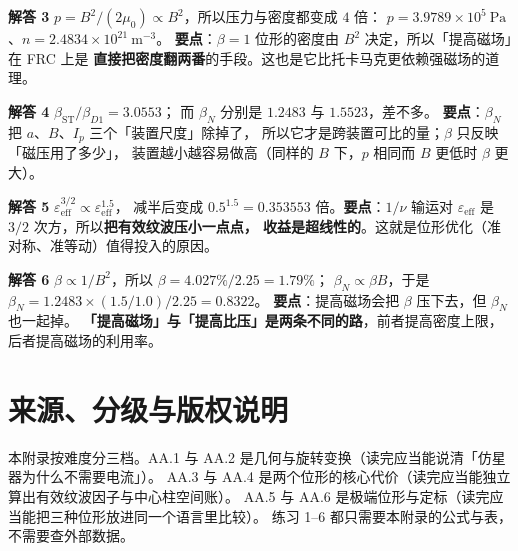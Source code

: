 \textbf{解答 3} $p = B^2/(2\mu_0) \propto B^2$，所以压力与密度都变成 $4$ 倍：
$p = 3.9789\times10^{5}\ \mathrm{Pa}$、$n = 2.4834\times10^{21}\ \mathrm{m^{-3}}$。
\textbf{要点}：$\beta=1$ 位形的密度由 $B^2$ 决定，所以「提高磁场」在 FRC 上是
\textbf{直接把密度翻两番}的手段。这也是它比托卡马克更依赖强磁场的道理。

\textbf{解答 4} $\beta_{\mathrm{ST}}/\beta_{D1} = 3.0553$；
而 $\beta_N$ 分别是 $1.2483$ 与 $1.5523$，差不多。
\textbf{要点}：$\beta_N$ 把 $a$、$B$、$I_p$ 三个「装置尺度」除掉了，
所以它才是跨装置可比的量；$\beta$ 只反映「磁压用了多少」，
装置越小越容易做高（同样的 $B$ 下，$p$ 相同而 $B$ 更低时 $\beta$ 更大）。

\textbf{解答 5} $\varepsilon_{\mathrm{eff}}^{3/2} \propto \varepsilon_{\mathrm{eff}}^{1.5}$，
减半后变成 $0.5^{1.5} = 0.353553$ 倍。\textbf{要点}：$1/\nu$ 输运对
$\varepsilon_{\mathrm{eff}}$ 是 $3/2$ 次方，所以\textbf{把有效纹波压小一点点，
收益是超线性的}。这就是位形优化（准对称、准等动）值得投入的原因。

\textbf{解答 6} $\beta \propto 1/B^2$，所以 $\beta = 4.027\%/2.25 = 1.79\%$；
$\beta_N \propto \beta B$，于是 $\beta_N = 1.2483\times(1.5/1.0)/2.25 = 0.8322$。
\textbf{要点}：提高磁场会把 $\beta$ 压下去，但 $\beta_N$ 也一起掉。
\textbf{「提高磁场」与「提高比压」是两条不同的路}，前者提高密度上限，
后者提高磁场的利用率。

\section{来源、分级与版权说明}
\label{sec:app-aa-source}

\begingroup\small
本附录按难度分三档。AA.1 与 AA.2 是几何与旋转变换（读完应当能说清「仿星器为什么不需要电流」）。
AA.3 与 AA.4 是两个位形的核心代价（读完应当能独立算出有效纹波因子与中心柱空间账）。
AA.5 与 AA.6 是极端位形与定标（读完应当能把三种位形放进同一个语言里比较）。
练习 1--6 都只需要本附录的公式与表，不需要查外部数据。


